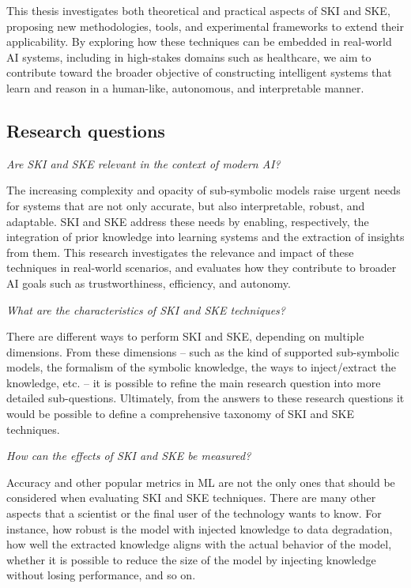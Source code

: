 \begin{refsection}
This thesis investigates both theoretical and practical aspects of \gls{SKI} and \gls{SKE}, proposing new methodologies, tools, and experimental frameworks to extend their applicability.
%
By exploring how these techniques can be embedded in real-world \gls{AI} systems, including in high-stakes domains such as healthcare, we aim to contribute toward the broader objective of constructing intelligent systems that learn and reason in a human-like, autonomous, and interpretable manner.



\subsection*{Research questions}
%
\begin{questions}
    \item \emph{Are \gls{SKI} and \gls{SKE} relevant in the context of modern \gls{AI}?}

    The increasing complexity and opacity of sub-symbolic models raise urgent needs for systems that are not only accurate, but also interpretable, robust, and adaptable.
    \Gls{SKI} and \gls{SKE} address these needs by enabling, respectively, the integration of prior knowledge into learning systems and the extraction of insights from them.
    This research investigates the relevance and impact of these techniques in real-world scenarios, and evaluates how they contribute to broader \gls{AI} goals such as trustworthiness, efficiency, and autonomy.
    \label{itm:rq0}

    \item \emph{What are the characteristics of \gls{SKI} and \gls{SKE} techniques?}

    There are different ways to perform \gls{SKI} and \gls{SKE}, depending on multiple dimensions.
    From these dimensions -- such as the kind of supported sub-symbolic models, the formalism of the symbolic knowledge, the ways to inject/extract the knowledge, etc. -- it is possible to refine the main research question into more detailed sub-questions.
    Ultimately, from the answers to these research questions it would be possible to define a comprehensive taxonomy of \gls{SKI} and \gls{SKE} techniques.
    \label{itm:rq1}

    \item \emph{How can the effects of \gls{SKI} and \gls{SKE} be measured?}

    Accuracy and other popular metrics in \gls{ML} are not the only ones that should be considered when evaluating \gls{SKI} and \gls{SKE} techniques.
    There are many other aspects that a scientist or the final user of the technology wants to know.
    For instance,
    how robust is the model with injected knowledge to data degradation,
    how well the extracted knowledge aligns with the actual behavior of the model,
    whether it is possible to reduce the size of the model by injecting knowledge without losing performance, and so on.
    \label{itm:rq2}


\end{questions}
\end{refsection}
